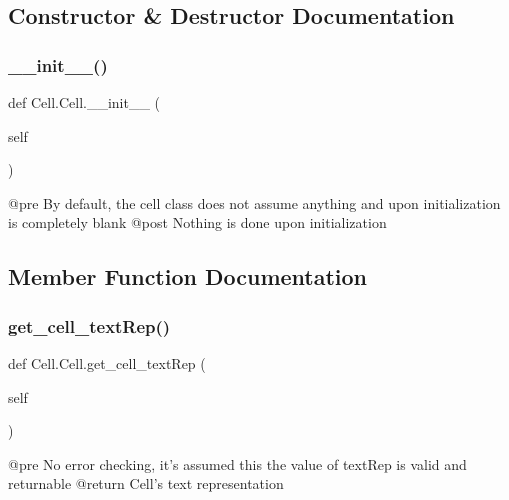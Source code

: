 \subsection{Constructor \& Destructor Documentation}
\mbox{\label{class_cell_1_1_cell_a2507e24b7fd159b949e0eae9c4f26f64}} 
\subsubsection{\texorpdfstring{\+\_\+\+\_\+init\+\_\+\+\_\+()}{\_\_init\_\_()}}
{\footnotesize\ttfamily def Cell.\+Cell.\+\_\+\+\_\+init\+\_\+\+\_\+ (\begin{DoxyParamCaption}\item[{}]{self }\end{DoxyParamCaption})}

\begin{DoxyVerb}@pre    By default, the cell class does not assume anything
and upon initialization is completely blank
    @post   Nothing is done upon initialization
\end{DoxyVerb}
 

\subsection{Member Function Documentation}
\mbox{\label{class_cell_1_1_cell_a0565862f2b86fb47e48f9d814bd52f7b}} 
\subsubsection{\texorpdfstring{get\+\_\+cell\+\_\+text\+Rep()}{get\_cell\_textRep()}}
{\footnotesize\ttfamily def Cell.\+Cell.\+get\+\_\+cell\+\_\+text\+Rep (\begin{DoxyParamCaption}\item[{}]{self }\end{DoxyParamCaption})}

\begin{DoxyVerb}@pre    No error checking, it's assumed this the value of textRep
is valid and returnable
    @return Cell's text representation
\end{DoxyVerb}
 \mbox{\label{class_cell_1_1_cell_ac0a083ab6a33c3a1886134a1fc1369ef}} 
